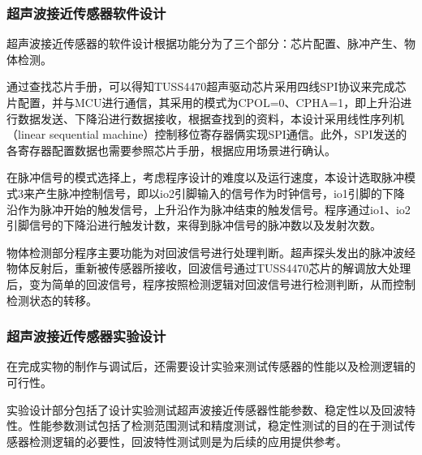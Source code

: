 \subsubsection{超声波接近传感器软件设计}
超声波接近传感器的软件设计根据功能分为了三个部分：芯片配置、脉冲产生、物体检测。\par
通过查找芯片手册，可以得知TUSS4470超声驱动芯片采用四线SPI协议来完成芯片配置，并与MCU进行通信，其采用的模式为CPOL=0、CPHA=1，即上升沿进行数据发送、下降沿进行数据接收，根据查找到的资料，本设计采用线性序列机（linear sequential machine）控制移位寄存器俩实现SPI通信。此外，SPI发送的各寄存器配置数据也需要参照芯片手册，根据应用场景进行确认。\par
在脉冲信号的模式选择上，考虑程序设计的难度以及运行速度，本设计选取脉冲模式3来产生脉冲控制信号，即以io2引脚输入的信号作为时钟信号，io1引脚的下降沿作为脉冲开始的触发信号，上升沿作为脉冲结束的触发信号。程序通过io1、io2引脚信号的下降沿进行触发计数，来得到脉冲信号的脉冲数以及发射次数。\par
物体检测部分程序主要功能为对回波信号进行处理判断。超声探头发出的脉冲波经物体反射后，重新被传感器所接收，回波信号通过TUSS4470芯片的解调放大处理后，变为简单的回波信号，程序按照检测逻辑对回波信号进行检测判断，从而控制检测状态的转移。
\subsubsection{超声波接近传感器实验设计}
在完成实物的制作与调试后，还需要设计实验来测试传感器的性能以及检测逻辑的可行性。\par
实验设计部分包括了设计实验测试超声波接近传感器性能参数、稳定性以及回波特性。性能参数测试包括了检测范围测试和精度测试，稳定性测试的目的在于测试传感器检测逻辑的必要性，回波特性测试则是为后续的应用提供参考。


